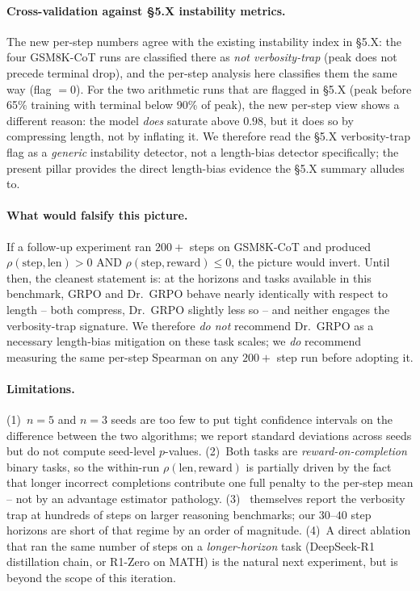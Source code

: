 \paragraph{Cross-validation against §5.X instability metrics.}
The new per-step numbers agree with the existing instability index
in §5.X: the four GSM8K-CoT runs are classified there as
\emph{not verbosity-trap} (peak does not precede terminal drop),
and the per-step analysis here classifies them the same way
(flag $=0$). For the two arithmetic runs that are flagged in
§5.X (peak before 65\% training with terminal below 90\% of
peak), the new per-step view shows a different reason: the model
\emph{does} saturate above $0.98$, but it does so by compressing
length, not by inflating it. We therefore read the §5.X verbosity-trap
flag as a \emph{generic} instability detector, not a length-bias
detector specifically; the present pillar provides the direct
length-bias evidence the §5.X summary alludes to.

\paragraph{What would falsify this picture.}
If a follow-up experiment ran $200{+}$ steps on GSM8K-CoT and
produced $\rho(\text{step},\text{len})>0$ AND
$\rho(\text{step},\text{reward})\le 0$, the picture would invert.
Until then, the cleanest statement is: at the horizons and tasks
available in this benchmark, GRPO and Dr.~GRPO behave nearly
identically with respect to length -- both compress, Dr.~GRPO
slightly less so -- and neither engages the verbosity-trap
signature. We therefore \emph{do not} recommend Dr.~GRPO as a
necessary length-bias mitigation on these task scales; we
\emph{do} recommend measuring the same per-step Spearman on any
$200{+}$ step run before adopting it.

\paragraph{Limitations.}
(1)~$n{=}5$ and $n{=}3$ seeds are too few to put tight confidence
intervals on the difference between the two algorithms; we report
standard deviations across seeds but do not compute seed-level
$p$-values. (2)~Both tasks are \emph{reward-on-completion}
binary tasks, so the within-run $\rho(\text{len},\text{reward})$
is partially driven by the fact that longer incorrect completions
contribute one full penalty to the per-step mean -- not by an
advantage estimator pathology. (3)~\cite{tong2025drgrpo} themselves
report the verbosity trap at hundreds of steps on larger
reasoning benchmarks; our $30$--$40$ step horizons are short of
that regime by an order of magnitude. (4)~A direct ablation that
ran the same number of steps on a \emph{longer-horizon} task
(DeepSeek-R1 distillation chain, or R1-Zero on MATH) is the
natural next experiment, but is beyond the scope of this
iteration.

